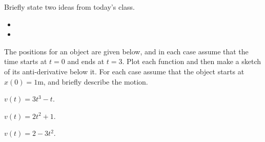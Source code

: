 \begin{problem}
\begin{problem}
\item Briefly state two ideas from today's class.
  \begin{itemize}
  \item
  \item
  \end{itemize}

\item The positions for an object are given below, and in each case
  assume that the time starts at $t=0$ and ends at $t=3$. Plot each
  function and then make a sketch of its anti-derivative below it.
  For each case assume that the object starts at $x(0)=1$m, and
  briefly describe the motion.

  \begin{subproblem}
    \item $v(t)= 3t^3-t$.
      \vfill
    \item $v(t)=2t^2 + 1$.
      \vfill
    \item $v(t)=2-3t^2$.
      \vfill
  \end{subproblem}

\end{problem}
\end{problem}



